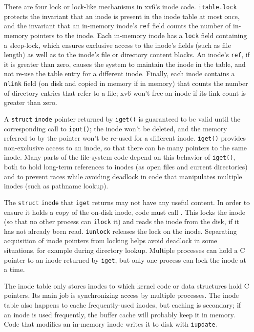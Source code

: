 There are four lock or lock-like mechanisms in xv6's
inode code.
\lstinline{itable.lock}
protects the invariant that an inode is present in the inode table
at most once, and the invariant that an in-memory inode's
\lstinline{ref}
field counts the number of in-memory pointers to the inode.
Each in-memory inode has a
\lstinline{lock}
field containing a
sleep-lock, which ensures exclusive access to the
inode's fields (such as file length) as well as to the
inode's file or directory content blocks.
An inode's
\lstinline{ref},
if it is greater than zero, causes the system to maintain
the inode in the table, and not re-use the table entry for
a different inode.
Finally, each inode contains a
\lstinline{nlink}
field (on disk and copied in memory if in memory) that
counts the number of directory entries that refer to a file;
xv6 won't free an inode if its link count is greater than zero.

A
\lstinline{struct}
\lstinline{inode}
pointer returned by
\lstinline{iget()}
is guaranteed to be valid until the corresponding call to
\lstinline{iput()};
the inode won't be deleted, and the memory referred to
by the pointer won't be re-used for a different inode.
\lstinline{iget()}
provides non-exclusive access to an inode, so that
there can be many pointers to the same inode.
Many parts of the file-system code depend on this behavior of
\lstinline{iget()},
both to hold long-term references to inodes (as open files
and current directories) and to prevent races while avoiding
deadlock in code that manipulates multiple inodes (such as
pathname lookup).

The
\lstinline{struct}
\lstinline{inode}
that 
\lstinline{iget}
returns may not have any useful content.
In order to ensure it holds a copy of the on-disk
inode, code must call
.
This locks the inode (so that no other process can
\lstinline{ilock}
it) and reads the inode from the disk,
if it has not already been read.
\lstinline{iunlock}
releases the lock on the inode.
Separating acquisition of inode pointers from locking
helps avoid deadlock in some situations, for example during
directory lookup.
Multiple processes can hold a C pointer to an inode
returned by 
\lstinline{iget},
but only one process can lock the inode at a time.

The inode table only stores inodes to which kernel code
or data structures hold C pointers.
Its main job is synchronizing access by multiple processes.
The inode table also happens to cache frequently-used inodes, but
caching is secondary; if an inode is used frequently, the buffer cache will probably
keep it in memory.
Code that modifies an in-memory inode writes it to disk with
\lstinline{iupdate}.

